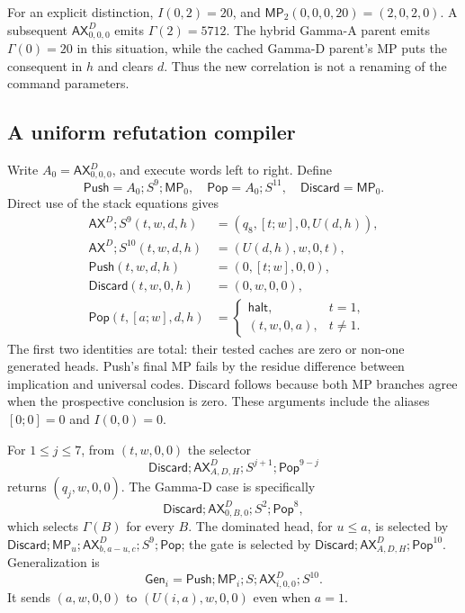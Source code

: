 For an explicit distinction, $I(0,2)=20$, and
$\mathsf{MP}_2(0,0,0,20)=(2,0,2,0)$. A subsequent
$\mathsf{AX}^{D}_{0,0,0}$ emits $\Gamma(2)=5712$. The hybrid Gamma-A
parent emits $\Gamma(0)=20$ in this situation, while the cached Gamma-D
parent's MP puts the consequent in $h$ and clears $d$. Thus the new
correlation is not a renaming of the command parameters.

\subsection{A uniform refutation compiler}

Write $A_0=\mathsf{AX}^{D}_{0,0,0}$, and execute words left to right.
Define
\[
 \mathsf{Push}=A_0;S^9;\mathsf{MP}_0,\quad
 \mathsf{Pop}=A_0;S^{11},\quad
 \mathsf{Discard}=\mathsf{MP}_0.
\]
Direct use of the stack equations gives
\begin{align*}
 \mathsf{AX}^{D};S^9(t,w,d,h)&=(q_8,[t;w],0,U(d,h)),\\
 \mathsf{AX}^{D};S^{10}(t,w,d,h)&=(U(d,h),w,0,t),\\
 \mathsf{Push}(t,w,d,h)&=(0,[t;w],0,0),\\
 \mathsf{Discard}(t,w,0,h)&=(0,w,0,0),\\
 \mathsf{Pop}(t,[a;w],d,h)&=
 \begin{cases}\mathsf{halt},&t=1,\\(t,w,0,a),&t\ne1.\end{cases}
\end{align*}
The first two identities are total: their tested caches are zero or
non-one generated heads. Push's final MP fails by the residue difference
between implication and universal codes. Discard follows because both MP
branches agree when the prospective conclusion is zero. These arguments
include the aliases $[0;0]=0$ and $I(0,0)=0$.

For $1\le j\le7$, from $(t,w,0,0)$ the selector
\[
 \mathsf{Discard};\mathsf{AX}^{D}_{A,D,H};S^{j+1};\mathsf{Pop}^{9-j}
\]
returns $(q_j,w,0,0)$. The Gamma-D case is specifically
\[
 \mathsf{Discard};\mathsf{AX}^{D}_{0,B,0};S^2;\mathsf{Pop}^{8},
\]
which selects $\Gamma(B)$ for every $B$. The dominated head, for $u\le a$,
is selected by
$\mathsf{Discard};\mathsf{MP}_u;\mathsf{AX}^{D}_{b,a-u,c};S^9;\mathsf{Pop}$;
the gate is selected by
$\mathsf{Discard};\mathsf{AX}^{D}_{A,D,H};\mathsf{Pop}^{10}$.
Generalization is
\[
 \mathsf{Gen}_i=\mathsf{Push};\mathsf{MP}_i;S;
                  \mathsf{AX}^{D}_{i,0,0};S^{10}.
\]
It sends $(a,w,0,0)$ to $(U(i,a),w,0,0)$ even when $a=1$.

